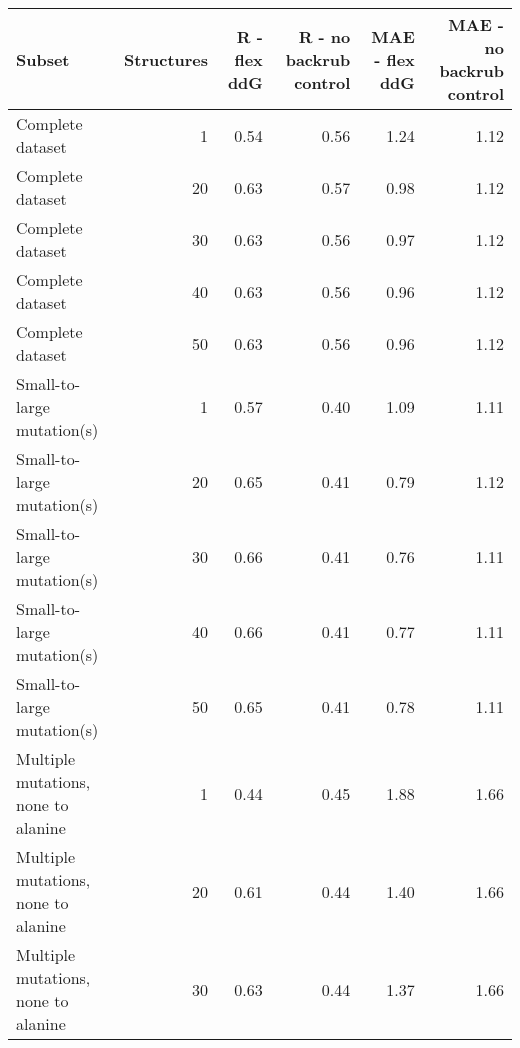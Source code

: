 \begin{table}
\begin{tabular}{lrrrrr}
\toprule
                              Subset &  Structures &  R - flex ddG &  R - no backrub control &  MAE - flex ddG &  MAE - no backrub control \\
\midrule
                    Complete dataset &           1 &          0.54 &                    0.56 &            1.24 &                      1.12 \\
                    Complete dataset &          20 &          0.63 &                    0.57 &            0.98 &                      1.12 \\
                    Complete dataset &          30 &          0.63 &                    0.56 &            0.97 &                      1.12 \\
                    Complete dataset &          40 &          0.63 &                    0.56 &            0.96 &                      1.12 \\
                    Complete dataset &          50 &          0.63 &                    0.56 &            0.96 &                      1.12 \\
          Small-to-large mutation(s) &           1 &          0.57 &                    0.40 &            1.09 &                      1.11 \\
          Small-to-large mutation(s) &          20 &          0.65 &                    0.41 &            0.79 &                      1.12 \\
          Small-to-large mutation(s) &          30 &          0.66 &                    0.41 &            0.76 &                      1.11 \\
          Small-to-large mutation(s) &          40 &          0.66 &                    0.41 &            0.77 &                      1.11 \\
          Small-to-large mutation(s) &          50 &          0.65 &                    0.41 &            0.78 &                      1.11 \\
 Multiple mutations, none to alanine &           1 &          0.44 &                    0.45 &            1.88 &                      1.66 \\
 Multiple mutations, none to alanine &          20 &          0.61 &                    0.44 &            1.40 &                      1.66 \\
 Multiple mutations, none to alanine &          30 &          0.63 &                    0.44 &            1.37 &                      1.66 \\

\end{tabular}
\end{table}
